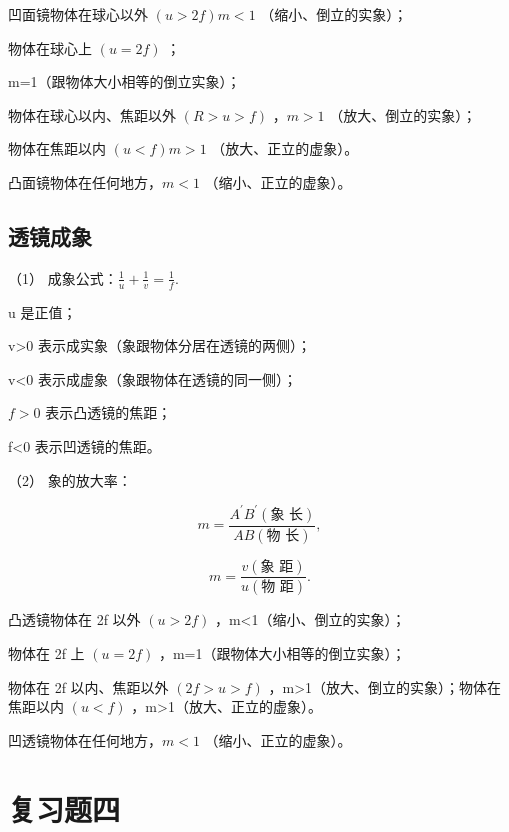 凹面镜物体在球心以外 \((u > 2f)\)\(m < 1\) （缩小、倒立的实象）；

物体在球心上 \((u=2f)\) ；

m=1（跟物体大小相等的倒立实象）；

物体在球心以内、焦距以外 \((R>u>f)\) ，\(m > 1\) （放大、倒立的实象）；

物体在焦距以内 \((u < f)\)\(m > 1\) （放大、正立的虚象）。

凸面镜物体在任何地方，\(m < 1\) （缩小、正立的虚象）。

\subsection{透镜成象}

（1） 成象公式：\(\frac{1}{u} + \frac{1}{v} = \frac{1}{f}\).

u 是正值；

v\textgreater0 表示成实象（象跟物体分居在透镜的两侧）；

v\textless0 表示成虚象（象跟物体在透镜的同一侧）；

\(f > 0\) 表示凸透镜的焦距；

f\textless0 表示凹透镜的焦距。

（2） 象的放大率：

\[
m = \frac {A ^ {\prime} B ^ {\prime} (\text{象 长})}{A B (\text{物 长})},
\]

\[
m = \frac {v (\text{象 距})}{u (\text{物 距})}.
\]

凸透镜物体在 2f 以外 \((u>2f)\) ，m\textless1（缩小、倒立的实象）；

物体在 2f 上 \((u=2f)\) ，m=1（跟物体大小相等的倒立实象）；

物体在 2f 以内、焦距以外 \((2f>u>f)\)
，m\textgreater1（放大、倒立的实象）；物体在焦距以内 \((u<f)\)
，m\textgreater1（放大、正立的虚象）。

凹透镜物体在任何地方，\(m < 1\) （缩小、正立的虚象）。

\section{复习题四}

